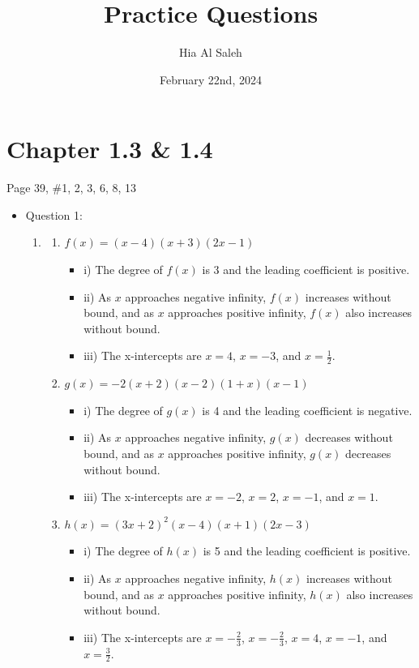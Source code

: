 \documentclass{article}
\title{Practice Questions}
\author{Hia Al Saleh}
\date{February 22nd, 2024}
\begin{document}
\maketitle
\section*{Chapter 1.3 \& 1.4}
Page 39, \#1, 2, 3, 6, 8, 13

\begin{itemize}
\item Question 1:
\begin{enumerate}
    \item 
    \begin{enumerate}
        \item $f(x) = (x - 4)(x + 3)(2x - 1)$
        \begin{itemize}
            \item i) The degree of $f(x)$ is 3 and the leading coefficient is positive.
            \item ii) As $x$ approaches negative infinity, $f(x)$ increases without bound, and as $x$ approaches positive infinity, $f(x)$ also increases without bound.
            \item iii) The x-intercepts are $x = 4$, $x = -3$, and $x = \frac{1}{2}$.
        \end{itemize}
        
        \item $g(x) = -2(x + 2)(x - 2)(1 + x)(x - 1)$
        \begin{itemize}
            \item i) The degree of $g(x)$ is 4 and the leading coefficient is negative.
            \item ii) As $x$ approaches negative infinity, $g(x)$ decreases without bound, and as $x$ approaches positive infinity, $g(x)$ decreases without bound.
            \item iii) The x-intercepts are $x = -2$, $x = 2$, $x = -1$, and $x = 1$.
        \end{itemize}
        
        \item $h(x) = (3x + 2)^2(x - 4)(x + 1)(2x - 3)$
        \begin{itemize}
            \item i) The degree of $h(x)$ is 5 and the leading coefficient is positive.
            \item ii) As $x$ approaches negative infinity, $h(x)$ increases without bound, and as $x$ approaches positive infinity, $h(x)$ also increases without bound.
            \item iii) The x-intercepts are $x = -\frac{2}{3}$, $x = -\frac{2}{3}$, $x = 4$, $x = -1$, and $x = \frac{3}{2}$.
        \end{itemize}
        

\end{enumerate}
\end{enumerate}
\end{itemize}
\end{document}
